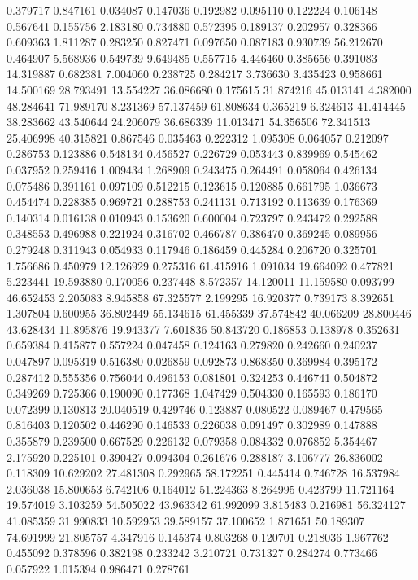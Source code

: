 0.379717
0.847161
0.034087
0.147036
0.192982
0.095110
0.122224
0.106148
0.567641
0.155756
2.183180
0.734880
0.572395
0.189137
0.202957
0.328366
0.609363
1.811287
0.283250
0.827471
0.097650
0.087183
0.930739
56.212670
0.464907
5.568936
0.549739
9.649485
0.557715
4.446460
0.385656
0.391083
14.319887
0.682381
7.004060
0.238725
0.284217
3.736630
3.435423
0.958661
14.500169
28.793491
13.554227
36.086680
0.175615
31.874216
45.013141
4.382000
48.284641
71.989170
8.231369
57.137459
61.808634
0.365219
6.324613
41.414445
38.283662
43.540644
24.206079
36.686339
11.013471
54.356506
72.341513
25.406998
40.315821
0.867546
0.035463
0.222312
1.095308
0.064057
0.212097
0.286753
0.123886
0.548134
0.456527
0.226729
0.053443
0.839969
0.545462
0.037952
0.259416
1.009434
1.268909
0.243475
0.264491
0.058064
0.426134
0.075486
0.391161
0.097109
0.512215
0.123615
0.120885
0.661795
1.036673
0.454474
0.228385
0.969721
0.288753
0.241131
0.713192
0.113639
0.176369
0.140314
0.016138
0.010943
0.153620
0.600004
0.723797
0.243472
0.292588
0.348553
0.496988
0.221924
0.316702
0.466787
0.386470
0.369245
0.089956
0.279248
0.311943
0.054933
0.117946
0.186459
0.445284
0.206720
0.325701
1.756686
0.450979
12.126929
0.275316
61.415916
1.091034
19.664092
0.477821
5.223441
19.593880
0.170056
0.237448
8.572357
14.120011
11.159580
0.093799
46.652453
2.205083
8.945858
67.325577
2.199295
16.920377
0.739173
8.392651
1.307804
0.600955
36.802449
55.134615
61.455339
37.574842
40.066209
28.800446
43.628434
11.895876
19.943377
7.601836
50.843720
0.186853
0.138978
0.352631
0.659384
0.415877
0.557224
0.047458
0.124163
0.279820
0.242660
0.240237
0.047897
0.095319
0.516380
0.026859
0.092873
0.868350
0.369984
0.395172
0.287412
0.555356
0.756044
0.496153
0.081801
0.324253
0.446741
0.504872
0.349269
0.725366
0.190090
0.177368
1.047429
0.504330
0.165593
0.186170
0.072399
0.130813
20.040519
0.429746
0.123887
0.080522
0.089467
0.479565
0.816403
0.120502
0.446290
0.146533
0.226038
0.091497
0.302989
0.147888
0.355879
0.239500
0.667529
0.226132
0.079358
0.084332
0.076852
5.354467
2.175920
0.225101
0.390427
0.094304
0.261676
0.288187
3.106777
26.836002
0.118309
10.629202
27.481308
0.292965
58.172251
0.445414
0.746728
16.537984
2.036038
15.800653
6.742106
0.164012
51.224363
8.264995
0.423799
11.721164
19.574019
3.103259
54.505022
43.963342
61.992099
3.815483
0.216981
56.324127
41.085359
31.990833
10.592953
39.589157
37.100652
1.871651
50.189307
74.691999
21.805757
4.347916
0.145374
0.803268
0.120701
0.218036
1.967762
0.455092
0.378596
0.382198
0.233242
3.210721
0.731327
0.284274
0.773466
0.057922
1.015394
0.986471
0.278761
